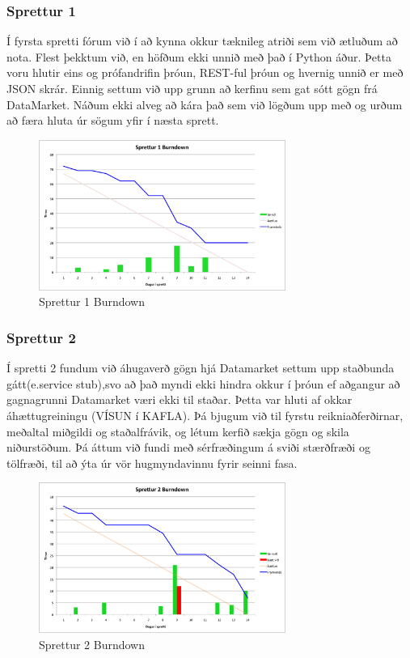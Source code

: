 \documentclass{article}
\begin{document}
\subsubsection{Sprettur 1}
Í fyrsta spretti fórum við í að kynna okkur tæknileg atriði sem við ætluðum að nota.
Flest þekktum við, en höfðum ekki unnið með það í Python áður. Þetta voru hlutir eins og prófandrifin þróun, REST-ful þróun og hvernig 
unnið er með JSON skrár. Einnig settum við upp grunn að kerfinu sem gat sótt gögn frá DataMarket. Náðum ekki alveg að kára það sem við lögðum 
upp með og urðum að færa hluta úr sögum yfir í næsta sprett.
\begin{figure}[H]
  \centering
  \includegraphics[width=0.72\textwidth]{Sprettur1_Burndown.png}
  \caption{Sprettur 1 Burndown}
\end{figure}

\subsubsection{Sprettur 2}
Í spretti 2 fundum við áhugaverð gögn hjá Datamarket settum upp staðbunda gátt(e.service stub),svo að það myndi ekki hindra okkur í þróun ef 
aðgangur að gagnagrunni Datamarket væri ekki til staðar. Þetta var hluti af okkar áhættugreiningu (VÍSUN í KAFLA). 
Þá bjugum við til fyrstu reikniaðferðirnar, meðaltal miðgildi og staðalfrávik, og létum kerfið sækja gögn og skila niðurstöðum.
Þá áttum við fundi með sérfræðingum á sviði stærðfræði og tölfræði, til að ýta úr vör hugmyndavinnu fyrir seinni fasa.
\begin{figure}[H]
 \centering
 \includegraphics[width=0.72\textwidth]{Sprettur2_Burndown.png}
 \caption{Sprettur 2 Burndown}
\end{figure}
\end{document}
